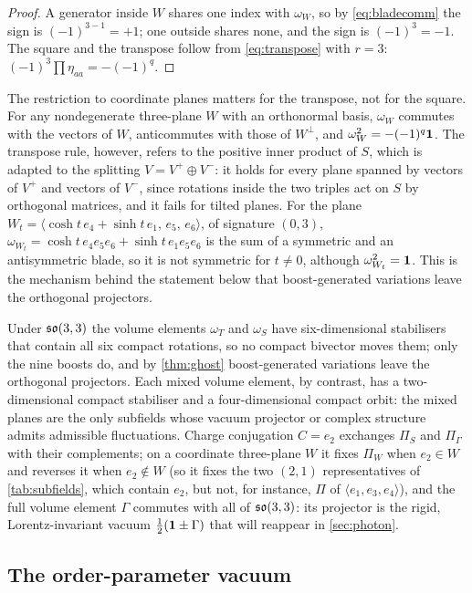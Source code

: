 \begin{proof}
A generator inside $W$ shares one index with $\omega_W$, so by \eqref{eq:bladecomm} the sign is $(-1)^{3-1}=+1$; one outside shares none, and
the sign is $(-1)^3=-1$. The square and the transpose follow from \eqref{eq:transpose} with $r=3$: $(-1)^{3}\prod\eta_{aa}=-(-1)^q$.
\end{proof}

The restriction to coordinate planes matters for the transpose, not for the square. For any nondegenerate three-plane $W$ with an orthonormal basis,
$\omega_W$ commutes with the vectors of $W$, anticommutes with those of $W^\perp$, and $\omega_W^2=-(-1)^q\mathbf 1$. The transpose rule, however, refers to the
positive inner product of $S$, which is adapted to the splitting $V=V^+\oplus V^-$: it holds for every plane spanned by vectors of $V^+$ and vectors of $V^-$,
since rotations inside the two triples act on $S$ by orthogonal matrices, and it fails for tilted planes. For the plane
$W_t=\langle\cosh t\,e_4+\sinh t\,e_1,\,e_5,\,e_6\rangle$, of signature $(0,3)$, $\omega_{W_t}=\cosh t\,e_4e_5e_6+\sinh t\,e_1e_5e_6$ is the sum of a symmetric and an
antisymmetric blade, so it is not symmetric for $t\neq0$, although $\omega_{W_t}^2=\mathbf 1$. This is the mechanism behind the statement below that boost-generated
variations leave the orthogonal projectors.

Under $\mathfrak{so}(3,3)$ the volume elements $\omega_T$ and $\omega_S$ have six-dimensional stabilisers that contain all six compact rotations, so no
compact bivector moves them; only the nine boosts do, and by \cref{thm:ghost} boost-generated variations leave the orthogonal projectors.
Each mixed volume element, by contrast, has a two-dimensional compact stabiliser and a four-dimensional compact orbit: the mixed planes are
the only subfields whose vacuum projector or complex structure admits admissible fluctuations. Charge conjugation $C=e_2$ exchanges $\Pi_S$
and $\Pi_\Gamma$ with their complements; on a coordinate three-plane $W$ it fixes $\Pi_W$ when $e_2\in W$ and reverses it when $e_2\notin W$ (so it fixes the two
$(2,1)$ representatives of \cref{tab:subfields}, which contain $e_2$, but not, for instance, $\Pi$ of $\langle e_1,e_3,e_4\rangle$), and the full volume element $\Gamma$ commutes with all of $\mathfrak{so}(3,3)$:
its projector is the rigid, Lorentz-invariant vacuum $\tfrac12(\mathbf 1\pm\Gamma)$ that will reappear in \cref{sec:photon}.

\subsection{The order-parameter vacuum}

